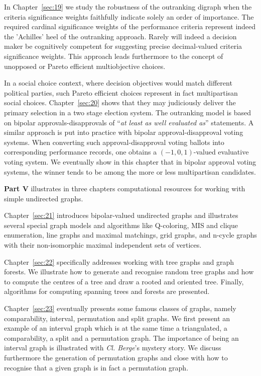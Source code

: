 In Chapter~\ref{sec:19} we study the robustness of the outranking digraph when the criteria significance weights faithfully indicate solely an order of importance. The required cardinal significance weights of the performance criteria represent indeed the ’Achilles’ heel of the outranking approach. Rarely will indeed a decision maker be cognitively competent for suggesting precise decimal-valued criteria significance weights. This approach leads furthermore to the concept of unopposed or Pareto efficient multiobjective choices.

In a social choice context, where decision objectives would match different political parties, such Pareto efficient choices represent in fact multipartisan social choices. Chapter~\ref{sec:20} shows that they may judiciously deliver the primary selection in a two stage election system. The outranking model is based on bipolar approvals-disapprovals of ``\emph{at least as well evaluated as}'' statements. A similar approach is put into practice with bipolar approval-disapproval voting systems. When converting such approval-disapproval voting ballots into corresponding performance records, one obtains a $(-1,0,1)$-valued evaluative voting system. We eventually show in this chapter that in bipolar approval voting systems, the winner tends to be among the more or less multipartisan candidates.
\vspace{5pt}

\textbf{Part V} illustrates in three chapters computational resources for working with simple undirected graphs.

Chapter~\ref{sec:21} introduces bipolar-valued undirected graphs and illustrates several special graph models and algorithms like Q-coloring, MIS and clique enumeration, line graphs and maximal matchings, grid graphs, and n-cycle graphs with their non-isomorphic maximal independent sets of vertices.

Chapter~\ref{sec:22} specifically addresses working with tree graphs and graph forests. We illustrate how to generate and recognise random tree graphs and how to compute the centres of a tree and draw a rooted and oriented tree. Finally, algorithms for computing spanning trees and forests are presented.

Chapter~\ref{sec:23} eventually presents some famous classes of \Berge graphs, namely comparability, interval, permutation and split graphs. We first present an example of an interval graph which is at the same time a triangulated, a comparability, a split and a permutation graph. The importance of being an interval graph is illustrated with \emph{Cl. Berge}’s mystery story. We discuss furthermore the generation of permutation graphs and close with how to recognise that a given graph is in fact a permutation graph.

